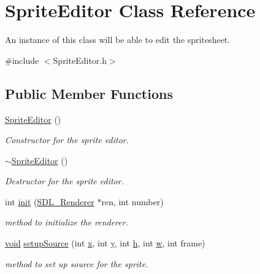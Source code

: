 \hypertarget{class_sprite_editor}{}\section{Sprite\+Editor Class Reference}
\label{class_sprite_editor}


An instance of this class will be able to edit the spritesheet.  




{\ttfamily \#include $<$Sprite\+Editor.\+h$>$}

\subsection*{Public Member Functions}
\begin{DoxyCompactItemize}
\item 
\mbox{\hyperlink{class_sprite_editor_ae4731260f822071b9306f154048076be}{Sprite\+Editor}} ()
\begin{DoxyCompactList}\small\item\em Constructor for the sprite editor. \end{DoxyCompactList}\item 
\mbox{\hyperlink{class_sprite_editor_a12db2758dc012a376fae747d188825e0}{$\sim$\+Sprite\+Editor}} ()
\begin{DoxyCompactList}\small\item\em Destructor for the sprite editor. \end{DoxyCompactList}\item 
int \mbox{\hyperlink{class_sprite_editor_a44b9278b996e26329ad9ac6bebccc006}{init}} (\mbox{\hyperlink{_s_d_l__render_8h_aaf0bf7d020754fc614fe06552ea4d5d4}{S\+D\+L\+\_\+\+Renderer}} $\ast$ren, int number)
\begin{DoxyCompactList}\small\item\em method to initialize the renderer. \end{DoxyCompactList}\item 
\mbox{\hyperlink{_s_d_l__opengles2__gl2ext_8h_ae5d8fa23ad07c48bb609509eae494c95}{void}} \mbox{\hyperlink{class_sprite_editor_ac07d9fe0838a38bbb8dfe7303ee48807}{setup\+Source}} (int \mbox{\hyperlink{_s_d_l__opengl_8h_ad0e63d0edcdbd3d79554076bf309fd47}{x}}, int \mbox{\hyperlink{_s_d_l__opengl_8h_a1675d9d7bb68e1657ff028643b4037e3}{y}}, int \mbox{\hyperlink{_s_d_l__opengl__glext_8h_afa0fb1b5e976920c0abeff2dca3ed774}{h}}, int \mbox{\hyperlink{_s_d_l__opengl__glext_8h_a6ee8f168a7ab6785a9bb57c6715dad99}{w}}, int frame)
\begin{DoxyCompactList}\small\item\em method to set up source for the sprite. \end{DoxyCompactList}\item 

\end{DoxyCompactItemize}
